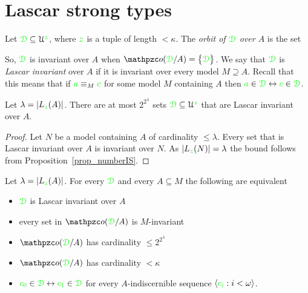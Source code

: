 \section{Lascar strong types}
\label{Lst}

Let ${\color{green}\EuScript D}\subseteq\EuScript U^{\color{green} z}$, where ${\color{green} z}$ is a tuple of length $<\kappa$.
The \emph{orbit of ${\color{green}\EuScript D}$ over $A$\/} is the set


So, ${\color{green}\EuScript D}$ is invariant over $A$ when $\oorbit(\grD/A)=\big\{\grD\big\}$.
We say that ${\color{green}\EuScript D}$ is \emph{Lascar invariant\/} over $A$ if it is invariant over every model $M\supseteq A$.
Recall that this means that if ${\color{green} a}\equiv_M{\color{green} c}$ for some model $M$ containing $A$ then ${\color{green} a}\in{\color{green}\EuScript D}\leftrightarrow{\color{green}c}\in{\color{green}\EuScript D}$.

\begin{proposition}\label{prop_numero_quasi_invarianti}
  Let $\lambda=|L_{\color{green} z}(A)|$.
There are at most $2^{2^{\lambda}}$ sets ${\color{green}\EuScript D}\subseteq\EuScript U^{\color{green} z}$ that are Lascar invariant over $A$.
\end{proposition}

\begin{proof}
  Let $N$ be a model containing $A$ of cardinality $\le\lambda$.
Every set that is Lascar invariant over $A$ is invariant over $N$.
As $|L_{\color{green} z}(N)|=\lambda$ the bound follows from Proposition~\ref{prop_numberIS}.
\end{proof}

\begin{theorem}\label{thm_Lascar_indiscernibles}
  Let $\lambda=|L_{\color{green} z}(A)|$.
  For every ${\color{green}\EuScript D}$ and every $A\subseteq M$ the following are equivalent
  \begin{itemize}
    \item[1.] ${\color{green}\EuScript D}$ is Lascar invariant over $A$
    \item[2.] every set in $\oorbit(\grD/A)$ is $M\mbox{-}$invariant
    \item[3.] $\oorbit(\grD/A)$ has cardinality $\le 2^{2^\lambda}$
    \item[4.] $\oorbit(\grD/A)$ has cardinality $<\kappa$
    \item[5.] ${\color{green} c_0}\in{\color{green}\EuScript D}\leftrightarrow{\color{green}c_1}\in{\color{green}\EuScript D}$ for every $A\mbox{-}$indiscernible sequence $\langle{\color{green}c_i}:i<\omega\rangle$.
  \end{itemize}
\end{theorem}

